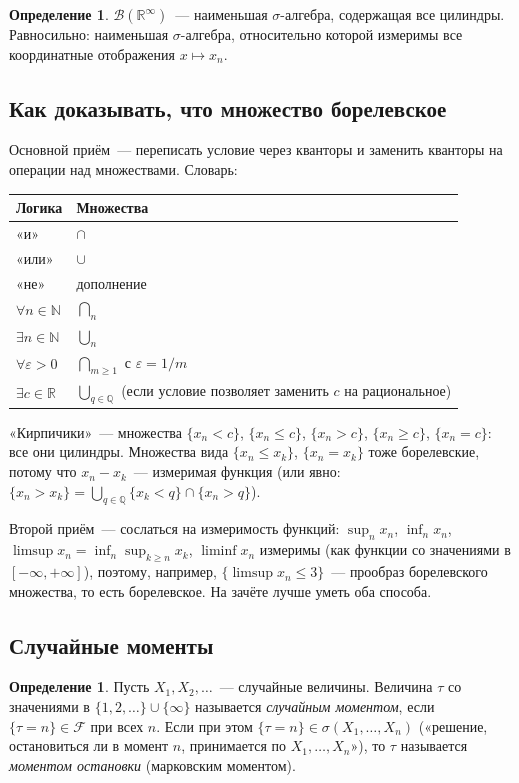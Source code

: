 \documentclass[11pt,a4paper]{article}
\theoremstyle{definition}
\newtheorem{defn}[thm]{Определение}
\newcommand{\R}{\mathbb R}
\newcommand{\N}{\mathbb N}
\newcommand{\Q}{\mathbb Q}
\newcommand{\B}{\mathcal B}
\newcommand{\F}{\mathcal F}
\newcommand{\1}{\mathbf 1}
\begin{document}
\begin{defn}
$\B(\R^\infty)$~--- наименьшая $\sigma$-алгебра, содержащая все цилиндры.
Равносильно: наименьшая $\sigma$-алгебра, относительно которой измеримы все
координатные отображения $x\mapsto x_n$.
\end{defn}

\subsection{Как доказывать, что множество борелевское}

Основной приём~--- переписать условие через кванторы и заменить кванторы на
операции над множествами. Словарь:
\begin{center}
\begin{tabular}{ll}
\toprule
Логика & Множества \\
\midrule
«и» & $\cap$ \\
«или» & $\cup$ \\
«не» & дополнение \\
$\forall n\in\N$ & $\bigcap_n$ \\
$\exists n\in\N$ & $\bigcup_n$ \\
$\forall\varepsilon>0$ & $\bigcap_{m\ge1}$ с $\varepsilon=1/m$ \\
$\exists c\in\R$ & $\bigcup_{q\in\Q}$ (если условие позволяет заменить $c$ на рациональное) \\
\bottomrule
\end{tabular}
\end{center}
«Кирпичики»~--- множества $\{x_n<c\}$, $\{x_n\le c\}$, $\{x_n>c\}$,
$\{x_n\ge c\}$, $\{x_n=c\}$: все они цилиндры. Множества вида
$\{x_n\le x_k\}$, $\{x_n=x_k\}$ тоже борелевские, потому что $x_n-x_k$~---
измеримая функция (или явно:
$\{x_n>x_k\}=\bigcup_{q\in\Q}\{x_k<q\}\cap\{x_n>q\}$).

Второй приём~--- сослаться на измеримость функций: $\sup_nx_n$, $\inf_nx_n$,
$\limsup x_n=\inf_n\sup_{k\ge n}x_k$, $\liminf x_n$ измеримы (как функции со
значениями в $[-\infty,+\infty]$), поэтому, например,
$\{\limsup x_n\le3\}$~--- прообраз борелевского множества, то есть борелевское.
На зачёте лучше уметь оба способа.

\subsection{Случайные моменты}

\begin{defn}
Пусть $X_1,X_2,\dots$~--- случайные величины. Величина $\tau$ со значениями в
$\{1,2,\dots\}\cup\{\infty\}$ называется \emph{случайным моментом}, если
$\{\tau=n\}\in\F$ при всех $n$. Если при этом $\{\tau=n\}\in\sigma(X_1,\dots,X_n)$
(«решение, остановиться ли в момент $n$, принимается по $X_1,\dots,X_n$»), то
$\tau$ называется \emph{моментом остановки} (марковским моментом).
\end{defn}
\end{document}
